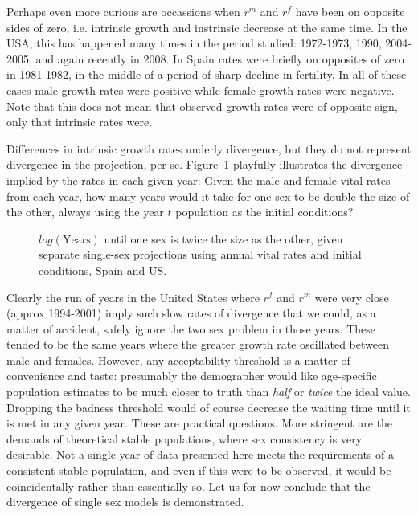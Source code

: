 Perhaps even more curious are occassions when $r^m$ and $r^f$ have been on
opposite sides of zero, i.e. intrinsic growth and instrinsic decrease at the
same time. In the USA, this has happened many times in the period studied:
1972-1973, 1990, 2004-2005, and again recently in 2008. In Spain rates were 
briefly on opposites of zero in 1981-1982, in the middle of a period of sharp
decline in fertility. In all of these cases male growth rates were positive
while female growth rates were negative. Note that this does not mean that 
observed growth rates were of opposite sign, only that intrinsic
rates were. 

Differences in intrinsic growth rates underly divergence, but they
do not represent divergence in the projection, per se.
Figure~\ref{fig:rSRdoubling} playfully illustrates the divergence implied by the 
rates in each given year: Given the
male and female vital rates from each year, how many years would it take for one
sex to be double the size of the other, always using the year $t$ population as
the initial conditions?

\begin{figure}[ht!]
        \centering  
          \caption{$log(\mathrm{Years})$ until one sex is twice the size as the
          other, given separate single-sex projections using annual vital rates and initial
          conditions, Spain and US.}
           \quad
          \label{fig:rSRdoubling}
\end{figure}

Clearly the run of years in the United States where $r^f$ and $r^m$ were very
close (approx 1994-2001) imply such slow rates of divergence that we could, as a
matter of accident, safely ignore the two sex problem in those years. These
tended to be the same years where the greater growth rate oscillated between
male and females. However, any acceptability threshold is a matter of
convenience and taste: presumably the demographer would like age-specific 
population estimates to be much closer to truth than \textit{half} or \textit{twice} the ideal value.
Dropping the badness threshold would of course decrease the waiting time until
it is met in any given year. These are practical questions. More
stringent are the demands of theoretical stable populations, where
sex consistency is very desirable. Not a single year of data presented here
meets the requirements of a consistent stable population, and even if this were
to be observed, it would be coincidentally rather than essentially so. Let us
for now conclude that the divergence of single sex models is demonstrated.











